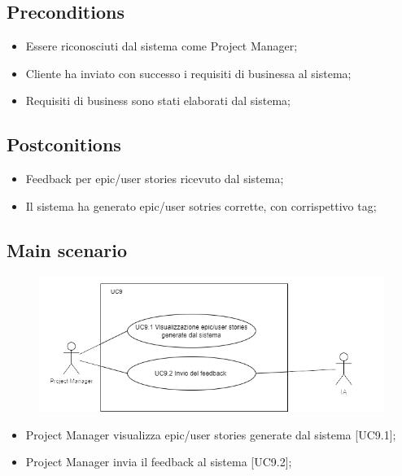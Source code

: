 \documentclass{article}
\begin{document}
    \subsection*{Preconditions}
        \begin{itemize}
            \item Essere riconosciuti dal sistema come Project Manager;
            \item Cliente ha inviato con successo i requisiti di businessa al sistema;
            \item Requisiti di business sono stati elaborati dal sistema;
        \end{itemize}
        
    \subsection*{Postconitions}
        \begin{itemize}
            \item Feedback per epic/user stories ricevuto dal sistema;
            \item Il sistema ha generato epic/user sotries corrette, con corrispettivo tag;
        \end{itemize}
        
    \subsection*{Main scenario}
        \begin{figure}[h]
          \centering
          \includegraphics{documenti/imgUML/UC9-zoom.png}
          \label{fig:immagine}
        \end{figure}

        \begin{itemize}
            \item Project Manager visualizza epic/user stories generate dal sistema [UC9.1];
            \item Project Manager invia il feedback al sistema [UC9.2];
        \end{itemize}
        
\end{document}
